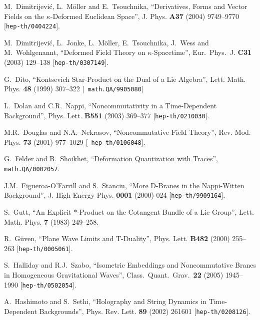 \documentclass[11pt,a4paper]{article}
\newcommand{\1}{\mathbb{1}}
\begin{document}
\begin{thebibliography}{99}
  M.~Dimitrijevi\'c, L.~M\"oller and E.~Tsouchnika,
  ``Derivatives, Forms and Vector Fields on the $\kappa$-Deformed
  Euclidean Space'', J. Phys. {\bf A37} (2004) 9749--9770
  [{\tt hep-th/0404224}].

  M.~Dimitrijevi\'c, L.~Jonke, L.~M\"oller, E.~Tsouchnika, J.~Wess and
  M.~Wohlgenannt,
  ``Deformed Field Theory on $\kappa$-Spacetime'',
  Eur.\ Phys.\ J. {\bf C31} (2003) 129--138
  [{\tt hep-th/0307149}].

 G.~Dito, ``Kontsevich Star-Product on the Dual of a
  Lie Algebra'', Lett. Math. Phys. {\bf 48} (1999) 307--322 [{\tt
  math.QA/9905080}]

 L.~Dolan and C.R.~Nappi, ``Noncommutativity in a
  Time-Dependent Background'', Phys. Lett. {\bf B551} (2003) 369--377
  [{\tt hep-th/0210030}].

 M.R.~Douglas and N.A.~Nekrasov, ``Noncommutative Field
  Theory'', Rev. Mod. Phys. {\bf 73} (2001) 977--1029 [{\tt
    hep-th/0106048}].

  G.~Felder and B.~Shoikhet,
  ``Deformation Quantization with Traces'',
  {\tt math.QA/0002057}.

 J.M.~Figueroa-O'Farrill and S.~Stanciu, ``More D-Branes
  in the Nappi-Witten Background'', J. High Energy Phys. {\bf 0001}
  (2000) 024 [{\tt hep-th/9909164}].

 S.~Gutt, ``An Explicit $*$-Product on the Cotangent
  Bundle of a Lie Group'', Lett. Math. Phys. {\bf 7} (1983) 249--258.

 R.~G\"uven, ``Plane Wave Limits and T-Duality'',
  Phys. Lett. {\bf B482} (2000) 255--263 [{\tt hep-th/0005061}].

  S.~Halliday and R.J.~Szabo,
  ``Isometric Embeddings and Noncommutative Branes in Homogeneous
  Gravitational Waves'',
  Class.\ Quant.\ Grav.\  {\bf 22} (2005) 1945--1990
  [{\tt hep-th/0502054}].

 A.~Hashimoto and S.~Sethi, ``Holography and String
  Dynamics in Time-Dependent Backgrounds'', Phys. Rev. Lett. {\bf 89}
  (2002) 261601 [{\tt hep-th/0208126}].


\end{thebibliography}
\end{document}
